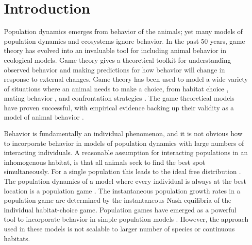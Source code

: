 \section{Introduction}
Population dynamics emerges from behavior of the animals; yet many models of population dynamics and ecosystems ignore behavior.  In the past 50 years, game theory has evolved into an invaluable tool for  including animal behavior in ecological models. Game theory gives a theoretical toolkit for understanding observed behavior and making predictions for how behavior will change in response to external changes. Game theory has been used to model a wide variety of situations where an animal needs to make a choice, from habitat choice \citep{krivan1997dynamic, kondoh2003foraging,kvrivan2008ideal}, mating behavior  \citep{rapoport1967exploiter}, and confrontation strategies \citep{smith1973logic}. The game theoretical models have proven successful, with empirical evidence backing up their validity as a model of animal behavior \citep{cooper1989communication,empirical_trait,behavioral_effects}.


Behavior is fundamentally an individual phenomenon, and it is not obvious how to incorporate behavior in models of population dynamics with large numbers of interacting individuals.  A reasonable assumption for interacting populations in an inhomogenous habitat, is that all animals seek to find the best spot simultaneously. For a single population this leads to the ideal free distribution \citep{fretwell1969territorial}. The population dynamics of a model where every individual is always at the best location is a population game \citep{kvrivan2009evolutionary}. The instantaneous population growth rates in a population game are determined by the instantaneous Nash equilibria of the individual habitat-choice game. Population games have emerged as a powerful tool to incorporate behavior in simple population models \citep{Krivan1998,genkai2007macrophyte, cressman2010ideal,pinti2021co, gonzalez2003dynamic}. However, the approach used in these models is not scalable to larger number of species or continuous habitats.


